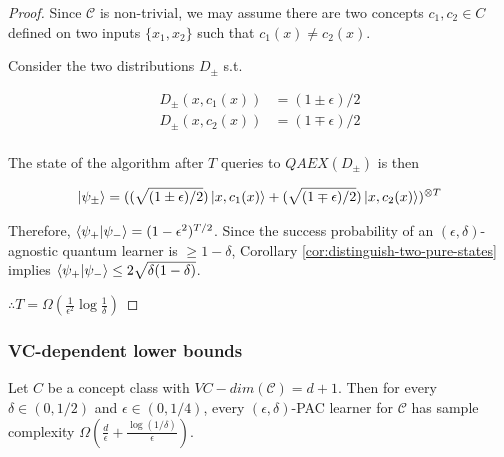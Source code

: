 \documentclass[main.tex]{subfiles}
\begin{document}
\begin{proof}
Since $\mathcal{C}$ is non-trivial, we may assume there are two concepts $c_1,c_2 \in C$ defined on two inputs $\{x_1,x_2\}$ such that $c_1(x) \neq c_2(x)$.

 Consider the two distributions $D_\pm$ s.t.
 
 \begin{align*}
 	D_\pm(x, c_1(x)) &= (1 \pm \epsilon)/2\\
 	D_\pm(x, c_2(x)) &= (1 \mp \epsilon)/2\\
 \end{align*}

The state of the algorithm after $T$ queries to $QAEX(D_\pm)$ is then
 
\begin{align*}
\ket{\psi_\pm} = ((\sqrt{(1\pm\epsilon)/2})\ket{x, c_1(x)} + (\sqrt{(1\mp\epsilon)/2})\ket{x, c_2(x)})^{\otimes T}
\end{align*}
 
 Therefore, $\bra{\psi_+}\ket{\psi_-} = (1-\epsilon^2)^{T/2}$. Since the success probability of an $(\epsilon, \delta)$-agnostic quantum learner is $\geq 1 - \delta$, Corollary \ref{cor:distinguish-two-pure-states} implies $\bra{\psi_+}\ket{\psi_-} \leq 2\sqrt{\delta(1-\delta)}$. 
 
 $\therefore T = \Omega(\frac{1}{\epsilon^2}\log \frac{1}{\delta})$
\end{proof}

\begin{corollary}
	
\end{corollary}


\subsubsection{VC-dependent lower bounds}

\begin{theorem}
Let $C$ be a concept class with $VC-dim(\mathcal{C}) = d + 1$. Then for every $\delta \in (0,1/2)$ and $\epsilon \in (0,1/4)$, every $(\epsilon,\delta)$-PAC learner for $\mathcal{C}$ has sample complexity $\Omega(\frac{d}{\epsilon} + \frac{\log(1/\delta)}{\epsilon})$.
\end{theorem}
\end{document}

